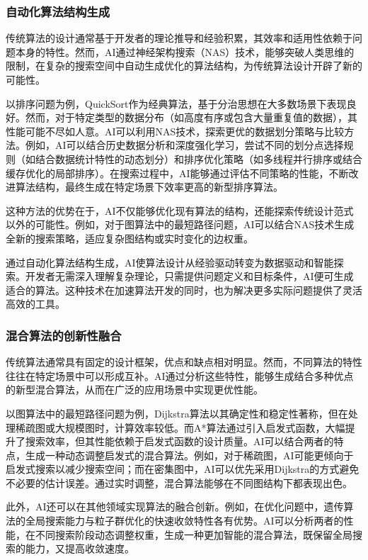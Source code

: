 \documentclass[supercite]{HustGraduPaper}
\begin{document}
	\subsubsection{\songti \bfseries 自动化算法结构生成}
	传统算法的设计通常基于开发者的理论推导和经验积累，其效率和适用性依赖于问题本身的特性。然而，AI通过神经架构搜索（NAS）技术，能够突破人类思维的限制，在复杂的搜索空间中自动生成优化的算法结构，为传统算法设计开辟了新的可能性。

以排序问题为例，QuickSort作为经典算法，基于分治思想在大多数场景下表现良好。然而，对于特定类型的数据分布（如高度有序或包含大量重复值的数据），其性能可能不尽如人意。AI可以利用NAS技术，探索更优的数据划分策略与比较方法。例如，AI可以结合历史数据分析和深度强化学习，尝试不同的划分点选择规则（如结合数据统计特性的动态划分）和排序优化策略（如多线程并行排序或结合缓存优化的局部排序）。在搜索过程中，AI能够通过评估不同策略的性能，不断改进算法结构，最终生成在特定场景下效率更高的新型排序算法。

这种方法的优势在于，AI不仅能够优化现有算法的结构，还能探索传统设计范式以外的可能性。例如，对于图算法中的最短路径问题，AI可以结合NAS技术生成全新的搜索策略，适应复杂图结构或实时变化的边权重。

通过自动化算法结构生成，AI使算法设计从经验驱动转变为数据驱动和智能探索。开发者无需深入理解复杂理论，只需提供问题定义和目标条件，AI便可生成适合的算法。这种技术在加速算法开发的同时，也为解决更多实际问题提供了灵活高效的工具。
	\subsubsection{\songti \bfseries 混合算法的创新性融合}
	传统算法通常具有固定的设计框架，优点和缺点相对明显。然而，不同算法的特性往往在特定场景中可以形成互补。AI通过分析这些特性，能够生成结合多种优点的新型混合算法，从而在广泛的应用场景中实现更优性能。

以图算法中的最短路径问题为例，Dijkstra算法以其确定性和稳定性著称，但在处理稀疏图或大规模图时，计算效率较低。而A*算法通过引入启发式函数，大幅提升了搜索效率，但其性能依赖于启发式函数的设计质量。AI可以结合两者的特点，生成一种动态调整启发式的混合算法。例如，对于稀疏图，AI可能更倾向于启发式搜索以减少搜索空间；而在密集图中，AI可以优先采用Dijkstra的方式避免不必要的估计误差。通过实时调整，混合算法能够在不同图结构下都表现出色。

此外，AI还可以在其他领域实现算法的融合创新。例如，在优化问题中，遗传算法的全局搜索能力与粒子群优化的快速收敛特性各有优势。AI可以分析两者的性能，在不同搜索阶段动态调整权重，生成一种更加智能的混合算法，既保留全局搜索的能力，又提高收敛速度。
\end{document}
